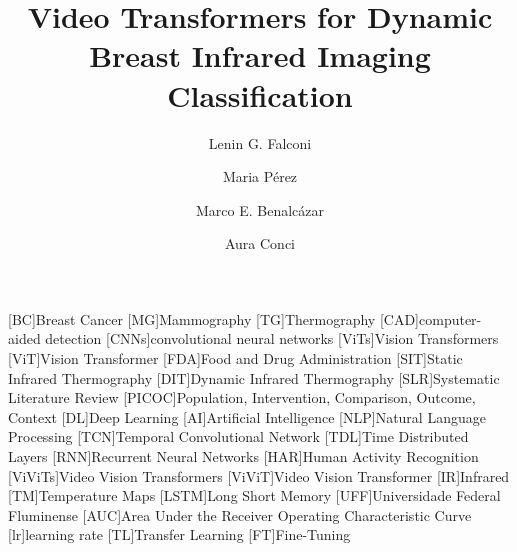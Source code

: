 \documentclass[runningheads]{llncs}
\begin{document}
\begin{acronym}
  [BC]{Breast Cancer}
  [MG]{Mammography}
  [TG]{Thermography}
  [CAD]{computer-aided detection}
  [CNNs]{convolutional neural networks}
  [ViTs]{Vision Transformers}
  [ViT]{Vision Transformer}
  [FDA]{Food and Drug Administration}
  [SIT]{Static Infrared Thermography}
  [DIT]{Dynamic Infrared Thermography}
  [SLR]{Systematic Literature Review}
  [PICOC]{Population, Intervention, Comparison, Outcome,
    Context}
  [DL]{Deep Learning}
  [AI]{Artificial Intelligence}
  [NLP]{Natural Language Processing}
  [TCN]{Temporal Convolutional Network}
  [TDL]{Time Distributed Layers}
  [RNN]{Recurrent Neural Networks}
  [HAR]{Human Activity Recognition}
  [ViViTs]{Video Vision Transformers}
  [ViViT]{Video Vision Transformer}
  [IR]{Infrared}
  [TM]{Temperature Maps}
  [LSTM]{Long Short Memory}
  [UFF]{Universidade Federal Fluminense}
  [AUC]{Area Under the Receiver Operating Characteristic
    Curve}
  [lr]{learning rate}
  [TL]{Transfer Learning}
  [FT]{Fine-Tuning}
\end{acronym}

% 
\title{Video Transformers for Dynamic Breast Infrared Imaging Classification}
%

% 
\author{Lenin G. Falconi \and
  Maria Pérez \and
  Marco E. Benalcázar \and 
Aura Conci}
% 
%
\end{document}
